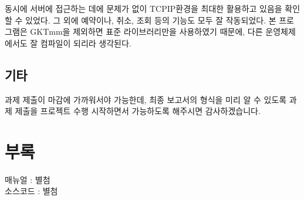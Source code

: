 \documentclass[12pt,a4paper]{report}
\begin{document}
동시에 서버에 접근하는 데에 문제가 없이 TCPIP환경을 최대한 활용하고 있음을 확인할 수 있었다.
그 외에 예약이나, 취소, 조회 등의 기능도 모두 잘 작동되었다.
본 프로그램은 GKTmm을 제외하면 표준 라이브러리만을 사용하였기 때문에, 다른 운영체제에서도 잘 컴파일이 되리라 생각된다.
\section{기타}
과제 제출이 마감에 가까워서야 가능한데, 최종 보고서의 형식을 미리 알 수 있도록 과제 제출을 프로젝트 수행 시작하면서 가능하도록 해주시면 감사하겠습니다.

\chapter{부록}
매뉴얼 : 별첨\\ 소스코드 : 별첨
\end{document}
